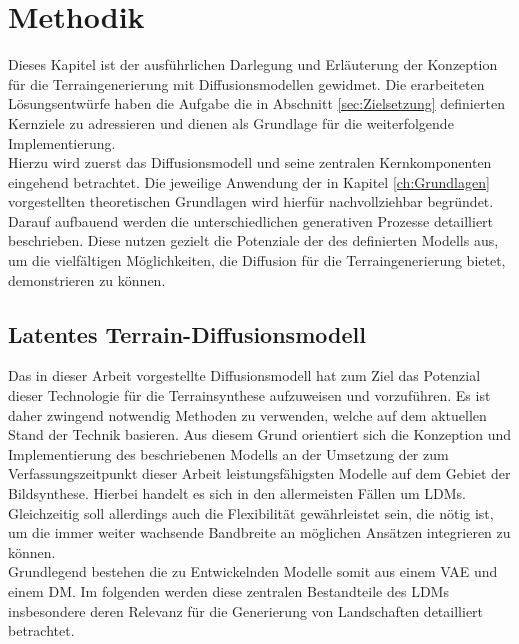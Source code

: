 \chapter{Methodik}
\label{ch:Methodik}

Dieses Kapitel ist der ausführlichen Darlegung und Erläuterung der Konzeption für die Terraingenerierung mit Diffusionsmodellen gewidmet. Die erarbeiteten Lösungsentwürfe haben die Aufgabe die in Abschnitt \ref{sec:Zielsetzung} definierten Kernziele zu adressieren und dienen als Grundlage für die weiterfolgende Implementierung. \\
Hierzu wird zuerst das Diffusionsmodell und seine zentralen Kernkomponenten eingehend betrachtet. Die jeweilige Anwendung der in Kapitel \ref{ch:Grundlagen} vorgestellten theoretischen Grundlagen wird hierfür nachvollziehbar begründet. \\
Darauf aufbauend werden die unterschiedlichen generativen Prozesse detailliert beschrieben. Diese nutzen gezielt die Potenziale der des definierten Modells aus, um die vielfältigen Möglichkeiten, die Diffusion für die Terraingenerierung bietet, demonstrieren zu können.

\section {Latentes Terrain-Diffusionsmodell}
\label{sec:Planung_LDM}

Das in dieser Arbeit vorgestellte Diffusionsmodell hat zum Ziel das Potenzial dieser Technologie für die Terrainsynthese aufzuweisen und vorzuführen. Es ist daher zwingend notwendig Methoden zu verwenden, welche auf dem aktuellen Stand der Technik basieren. Aus diesem Grund orientiert sich die Konzeption und Implementierung des beschriebenen Modells an der Umsetzung der zum Verfassungszeitpunkt dieser Arbeit leistungsfähigsten Modelle auf dem Gebiet der Bildsynthese. Hierbei handelt es sich in den allermeisten Fällen um LDMs. Gleichzeitig soll allerdings auch die Flexibilität gewährleistet sein, die nötig ist, um die immer weiter wachsende Bandbreite an möglichen Ansätzen integrieren zu können.\\
Grundlegend bestehen die zu Entwickelnden Modelle somit aus einem \ac{VAE} und einem \ac{DM}. Im folgenden werden diese zentralen Bestandteile des \ac{LDM}s insbesondere deren Relevanz für die Generierung von Landschaften detailliert betrachtet.

